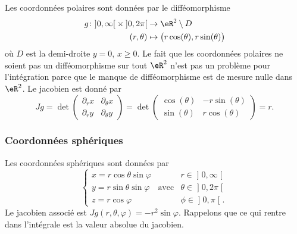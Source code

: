 Les coordonnées polaires sont données par le difféomorphisme
\begin{equation}
	\begin{aligned}
		g\colon \mathopen]0,\infty\mathclose[\times\mathopen]0,2\pi\mathclose[ &\to\eR^2\setminus D\\
		(r,\theta)&\mapsto \big( r\cos(\theta),r\sin(\theta) \big)
	\end{aligned}
\end{equation}
où $D$ est la demi-droite $y=0$, $x\geq 0$. Le fait que les coordonnées polaires ne soient pas un difféomorphisme sur tout $\eR^2$ n'est pas un problème pour l'intégration parce que le manque de difféomorphisme est de mesure nulle dans $\eR^2$. Le jacobien est donné par
\begin{equation}
	Jg=\det\begin{pmatrix}
	\partial_rx	&	\partial_{\theta}x	\\ 
	\partial_ry	&	\partial_{\theta}y
\end{pmatrix}=\det\begin{pmatrix}
	\cos(\theta)	&	-r\sin(\theta)	\\ 
	\sin(\theta)	&	r\cos(\theta)	
\end{pmatrix}=r.
\end{equation}

					\subsubsection{Coordonnées sphériques}
\label{SubSubCoordSpJxhMwm}

Les coordonnées sphériques sont données par
\begin{equation}		\label{OMEqChmVarSpherique}
	\left\{
\begin{array}{lllll}
x=r\cos\theta\sin\varphi	&			&r\in\mathopen] 0 , \infty \mathclose[\\
y=r\sin\theta\sin\varphi	&	\text{avec}	&\theta\in\mathopen] 0 , 2\pi \mathclose[\\
z=r\cos\varphi			&			&\phi\in\mathopen] 0 , \pi \mathclose[.
\end{array}
\right.
\end{equation}
Le jacobien associé est $Jg(r,\theta,\varphi)=-r^2\sin\varphi$. Rappelons que ce qui rentre dans l'intégrale est la valeur absolue du jacobien.

